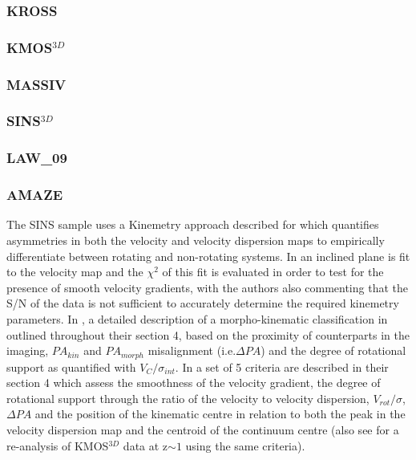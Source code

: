 \documentclass[fleqn,usenatbib]{mn2e}
\begin{document}
\subsubsection{KROSS}\label{subsubsec:KROSS}

\subsubsection{KMOS$^{3D}$}\label{subsubsec:kmos_3d}

\subsubsection{MASSIV}\label{subsubsec:MASSIV}

\subsubsection{SINS$^{3D}$}\label{subsubsec:SINS}

\subsubsection{LAW\_09}\label{subsubsec:law_09}

\subsubsection{AMAZE}\label{subsubsec:AMAZE}








The SINS sample uses a Kinemetry approach described for \citep{Shapiro2008,ForsterSchreiber2009,Cresci2009} which quantifies asymmetries in both the velocity and velocity dispersion maps to empirically differentiate between rotating and non-rotating systems.
In \cite{Gnerucci2011} an inclined plane is fit to the velocity map and the $\chi^{2}$ of this fit is evaluated in order to test for the presence of smooth velocity gradients, with the authors also commenting that the S/N of the data is not sufficient to accurately determine the required kinemetry parameters.
In \cite{Epinat2012}, a detailed description of a morpho-kinematic classification in outlined throughout their section 4, based on the proximity of counterparts in the imaging, $PA_{kin}$ and $PA_{morph}$ misalignment (i.e.$\Delta PA$) and the degree of rotational support as quantified with $V_{C}/\sigma_{int}$.
In \cite{Wisnioski2015} a set of 5 criteria are described in their section 4 which assess the smoothness of the velocity gradient, the degree of rotational support through the ratio of the velocity to velocity dispersion, $V_{rot}/\sigma$, $\Delta PA$ and the position of the kinematic centre in relation to both the peak in the velocity dispersion map and the centroid of the continuum centre (also see \cite{Rodrigues2016} for a re-analysis of KMOS$^{3D}$ data at z$\sim 1$ using the same criteria).
\end{document}
